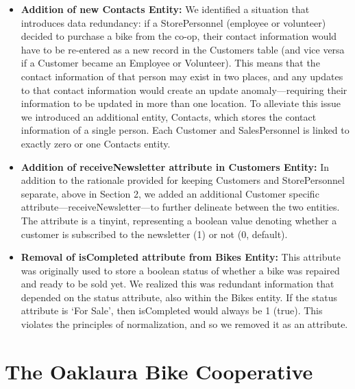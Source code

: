 \documentclass{article}
\begin{document}
\begin{tcolorbox}[colback=secondarycolor, colframe=primarycolor, arc=5mm]
 \vspace{0.2cm}
\begin{itemize}
  \item \textbf{Addition of new Contacts Entity:} We identified a situation that introduces data redundancy: if a StorePersonnel (employee or volunteer) decided to purchase a bike from the co-op, their contact information would have to be re-entered as a new record in the Customers table (and vice versa if a Customer became an Employee or Volunteer). This means that the contact information of that person may exist in two places, and any updates to that contact information would create an update anomaly---requiring their information to be updated in more than one location. To alleviate this issue we introduced an additional entity, Contacts, which stores the contact information of a single person. Each Customer and SalesPersonnel is linked to exactly zero or one Contacts entity.
  \vspace{0.1cm}
  \item \textbf{Addition of receiveNewsletter attribute in Customers Entity:} In addition to the rationale provided for keeping Customers and StorePersonnel separate, above in Section 2, we added an additional Customer specific attribute---receiveNewsletter---to further delineate between the two entities. The attribute is a tinyint, representing a boolean value denoting whether a customer is subscribed to the newsletter (1) or not (0, default).
  \vspace{0.1cm}
   \item \textbf{Removal of isCompleted attribute from Bikes Entity:} This attribute was originally used to store a boolean status of whether a bike was repaired and ready to be sold yet. We realized this was redundant information that depended on the status attribute, also within the Bikes entity. If the status attribute is `For Sale', then isCompleted would always be 1 (true). This violates the principles of normalization, and so we removed it as an attribute.
\end{itemize}

\end{tcolorbox}

\section{The Oaklaura Bike Cooperative}
\end{document}
